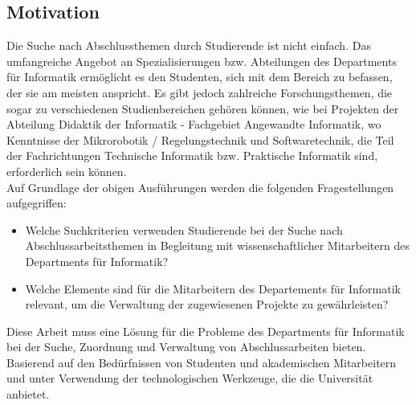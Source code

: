 \subsection{Motivation}
Die Suche nach Abschlussthemen durch Studierende ist nicht einfach.  Das umfangreiche Angebot an Spezialisierungen bzw. Abteilungen des Departments für Informatik ermöglicht es den Studenten, sich mit dem Bereich zu befassen, der sie am meisten anspricht. Es gibt jedoch zahlreiche Forschungsthemen, die sogar zu verschiedenen Studienbereichen gehören können, wie bei Projekten der Abteilung Didaktik der Informatik - Fachgebiet Angewandte Informatik, wo Kenntnisse der Mikrorobotik / Regelungstechnik und Softwaretechnik, die Teil der Fachrichtungen Technische Informatik bzw. Praktische Informatik sind, erforderlich sein können.\\

Auf Grundlage der obigen Ausführungen werden die folgenden Fragestellungen aufgegriffen:

\begin{itemize}
	\item Welche Suchkriterien verwenden Studierende bei der Suche nach Abschlussarbeitsthemen in Begleitung mit wissenschaftlicher Mitarbeitern des Departments für Informatik?
	
	\item Welche Elemente sind für die Mitarbeitern des Departements für Informatik relevant, um die Verwaltung der zugewiesenen Projekte zu gewährleisten?
\end{itemize}

Diese Arbeit muss eine Lösung für die Probleme des Departments für Informatik bei der Suche, Zuordnung und Verwaltung von Abschlussarbeiten bieten. Basierend auf den Bedürfnissen von Studenten und akademischen Mitarbeitern und unter Verwendung der technologischen Werkzeuge, die die Universität anbietet.
